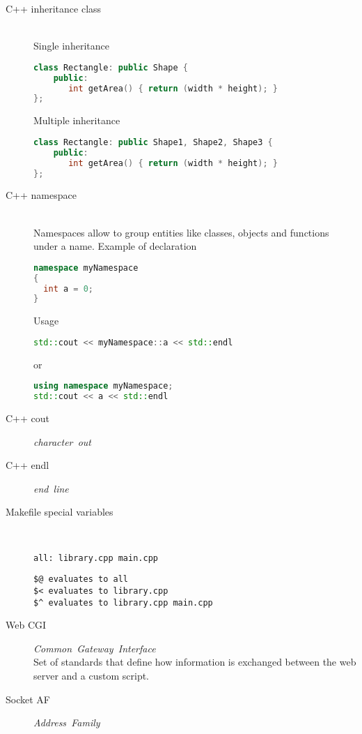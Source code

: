 \documentclass{article}
\begin{document}
\begin{description}
    \item[C++ inheritance class] \mbox{}\\ Single inheritance
\begin{lstlisting}[language=C++]
class Rectangle: public Shape {
    public:
       int getArea() { return (width * height); }
};
\end{lstlisting}
    Multiple inheritance
\begin{lstlisting}[language=C++]
class Rectangle: public Shape1, Shape2, Shape3 {
    public:
       int getArea() { return (width * height); }
};
\end{lstlisting}
    \item[C++ namespace] \mbox{}\\ Namespaces allow to group entities like classes, objects and functions under a name. Example of declaration
\begin{lstlisting}[language=C++]
namespace myNamespace
{
  int a = 0;
}
\end{lstlisting}

    Usage

\begin{lstlisting}[language=C++]
std::cout << myNamespace::a << std::endl
\end{lstlisting}
    or
\begin{lstlisting}[language=C++]
using namespace myNamespace;
std::cout << a << std::endl
\end{lstlisting}

    \item[C++ cout] \mbox{\textit{character out}}\\
    \item[C++ endl] \mbox{\textit{end line}}\\ 
    \item[Makefile special variables] \mbox{}\\
      
\begin{lstlisting}
all: library.cpp main.cpp
\end{lstlisting}

\begin{lstlisting}
$@ evaluates to all 
$< evaluates to library.cpp
$^ evaluates to library.cpp main.cpp
\end{lstlisting}

    \item[Web CGI] \mbox{\textit{Common Gateway Interface}}\\
    Set of standards that define how information is exchanged between the web server and a custom script.

    \item[Socket AF] \mbox{\textit{Address Family}}\\
\end{description}
\end{document}
